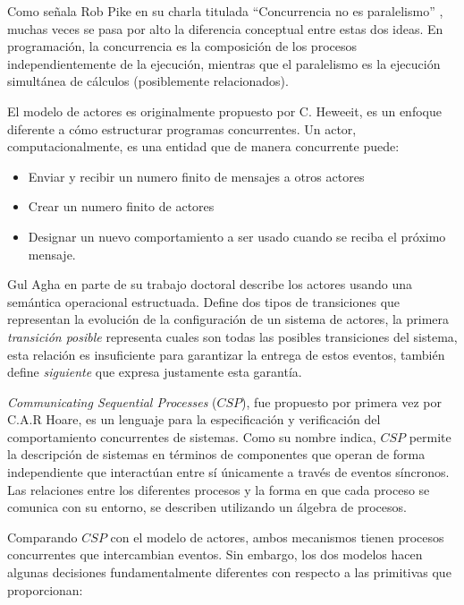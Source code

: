 Como señala Rob Pike en su charla titulada ``Concurrencia no es paralelismo'' \cite{rpike13_cnp}, muchas veces se pasa por alto la diferencia conceptual entre estas dos ideas. En programación, la concurrencia es la composición de los procesos independientemente de la ejecución, mientras que el paralelismo es la ejecución simultánea de cálculos (posiblemente relacionados). 

El modelo de actores es originalmente propuesto por C. Heweeit\cite{Wyatt:2013:AC:2663429}, es un enfoque diferente a cómo estructurar programas concurrentes. Un actor, computacionalmente, es una entidad que de manera concurrente puede:

\begin{itemize}
\item Enviar y recibir un numero finito de mensajes a otros actores
\item Crear un numero finito de actores
\item Designar un nuevo comportamiento a ser usado cuando se reciba el próximo mensaje.
\end{itemize}

Gul Agha\cite{Agha:1986:AMC:7929} en parte de su trabajo doctoral describe los actores usando una semántica operacional estructuada\cite{Plotkin81astructural}. Define dos tipos de transiciones que representan la evolución de la configuración de un sistema de actores, la primera \emph{transición posible} representa cuales son todas las posibles transiciones del sistema, esta relación es insuficiente para garantizar la entrega de estos eventos, también define \emph{siguiente} que expresa justamente esta garantía.

\emph{Communicating Sequential Processes} ($CSP$), fue propuesto por primera vez por C.A.R Hoare\cite{Hoare:1978:CSP:359576.359585}, es un lenguaje para la especificación y verificación del comportamiento concurrentes de sistemas. Como su nombre indica, $CSP$ permite la descripción de sistemas en términos de componentes que operan de forma independiente que interactúan entre sí únicamente a través de eventos síncronos. Las relaciones entre los diferentes procesos y la forma en que cada proceso se comunica con su entorno, se describen utilizando un álgebra de procesos.

Comparando $CSP$ con el modelo de actores, ambos mecanismos tienen procesos concurrentes que intercambian eventos. Sin embargo, los dos modelos hacen algunas decisiones fundamentalmente diferentes con respecto a las primitivas que proporcionan:

